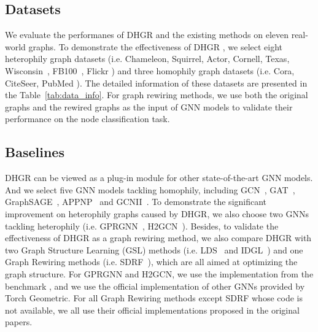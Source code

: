 \documentclass[sigconf]{acmart}
\begin{document}
	\subsection{Datasets}
	We evaluate the performanes of DHGR and the existing methods on eleven real-world graphs. To demonstrate the effectiveness of  DHGR , we select eight heterophily graph datasets (i.e. Chameleon, Squirrel, Actor, Cornell, Texas, Wisconsin~\cite{pei2020geom}, FB100~\cite{facebook100}, Flickr  \cite{zeng2019graphsaint}) and three homophily graph datasets (i.e. Cora, CiteSeer, PubMed \cite{GCN}). The detailed information of these datasets are presented in the Table~\ref{tab:data_info}. For graph rewiring methods, we use both the original graphs and the rewired graphs as the input of GNN models to validate their performance on the node classification task.
	\subsection{Baselines}
	DHGR can be viewed as a plug-in module for other state-of-the-art GNN models. And we select five GNN models tackling  homophily, including GCN~\cite{GCN}, GAT~\cite{GAT}, GraphSAGE~\cite{GraphSAGE}, APPNP~\cite{APPNP} and GCNII~\cite{GCN2}. To demonstrate the significant improvement on heterophily graphs caused by DHGR, we also choose two GNNs tackling heterophily (i.e. GPRGNN~\cite{chien2020adaptive}, H2GCN~\cite{h2gcn}). Besides, to validate the effectiveness of DHGR as a graph rewiring method, we also compare DHGR with two Graph Structure Learning (GSL) methods (i.e. LDS~\cite{LDS} and IDGL~\cite{chen2020iterative}) and one Graph Rewiring methods (i.e. SDRF~\cite{topping2021understanding}), which are all aimed at optimizing the graph structure. For GPRGNN and H2GCN, we use the implementation from the benchmark \cite{lim2021new}, and we use the official implementation of other GNNs provided by Torch Geometric. For all Graph Rewiring methods except SDRF whose code is not available, we all use their official implementations proposed in the original papers.
	
\end{document}
